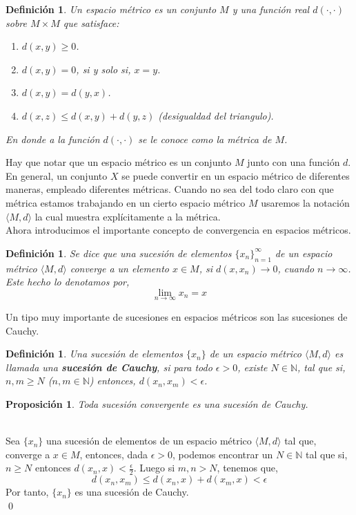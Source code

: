 \documentclass[12pt]{book}
\numberwithin{equation}{chapter}
\newtheorem{definition}[theorem]{Definici\'on}
\newtheorem{proposition}[theorem]{Proposici\'on}
\def\n{\noindent}
\def\la{\langle}
\def\ra{\rangle}
\def\rar{\rightarrow}
\begin{document}
\vspace{10 mm}

\begin{definition}
Un espacio m\'etrico es un conjunto $M$ y una funci\'on real $ d(\cdot , \cdot) $ sobre $ M \times M $ que satisface:
\begin{enumerate}
\item $ d(x,y) \geq 0 $.
\item $ d(x,y)=0 $, si y solo si, $x=y$.
\item $ d(x,y)=d(y,x) $.
\item $ d(x,z) \leq d(x,y) + d(y,z) $ (desigualdad del triangulo).
\end{enumerate}
En donde a la funci\'on $d(\cdot , \cdot )$ se le conoce como la m\'etrica de $M$. 
\end{definition}

\n Hay que notar que un espacio m\'etrico es un conjunto $M$ junto con una funci\'on $d$. En general, un conjunto $X$ se puede convertir en un espacio m\'etrico de diferentes maneras, empleado diferentes m\'etricas. Cuando no sea del todo claro con que m\'etrica estamos trabajando en un cierto espacio m\'etrico $M$ usaremos la notaci\'on $ \la M , d \ra $ la cual muestra expl\'icitamente a la m\'etrica.\\

\n Ahora introducimos el importante concepto de convergencia en espacios m\'etricos.

\begin{definition}
Se dice que una sucesi\'on de elementos $ \{x_{n}  \}_{n=1}^{\infty} $ de un espacio m\'etrico $\la M , d \ra$ converge a un elemento $x \in M$, si $ d(x,x_{n}) \rightarrow 0 $, cuando $ n \rar \infty $. Este hecho lo denotamos por,
$$ \lim_{n \rar \infty} x_{n}= x $$
\end{definition}
\n Un tipo muy importante de sucesiones en espacios m\'etricos son las sucesiones de Cauchy.
\begin{definition}
Una sucesi\'on de elementos $\{ x_{n} \}$ de un espacio m\'etrico $\la M , d \ra$ es llamada una {\bf sucesi\'on de Cauchy}, si para todo $\epsilon > 0$, existe $N \in \mathbb{N}$, tal que si, $ n,m \geq N $ ($n,m \in \mathbb{N}$) entonces, $d(x_{n},x_{m}) < \epsilon$.  
\end{definition}

\begin{proposition}
Toda sucesi\'on convergente es una sucesi\'on de Cauchy.
\end{proposition}
\n {\bf Demostraci\'on}\\
Sea $\{ x_{n} \}$ una sucesi\'on de elementos de un espacio m\'etrico $\la M, d \ra$ tal que, converge a $x \in M$, entonces, dada $\epsilon >0 $, podemos encontrar un $ N \in \mathbb{N} $ tal que si, $ n \geq N $ entonces $ d(x_{n},x) < \frac{\epsilon}{2} $. Luego si $ m,n > N $, tenemos que, 
$$ d(x_{n},x_{m}) \leq d(x_{n},x) + d(x_{m},x) < \epsilon $$
Por tanto, $\{ x_{n} \}$ es una sucesi\'on de Cauchy. \\ \qed
\end{document}
